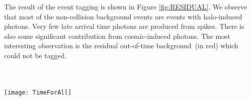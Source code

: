 \par 
The result of the event tagging is shown in Figure \ref{fig:RESIDUAL}. We observe that most of the non-collision background events are events with halo-induced photons. Very few late arrival time photons are produced from spikes. There is also some significant contribution from cosmic-induced photons. The most interesting observation is the residual out-of-time background~(in red) which could not be tagged. 

\paragraph*{}\mbox{}\\
\begin{minipage}{0.90\linewidth} 
\begin{center}
  \captionsetup{type=figure}
   \texttt{[image: TimeForAll]}
   \label{fig:RESIDUAL}
\end{center}
\end{minipage}

\vspace{5mm}


